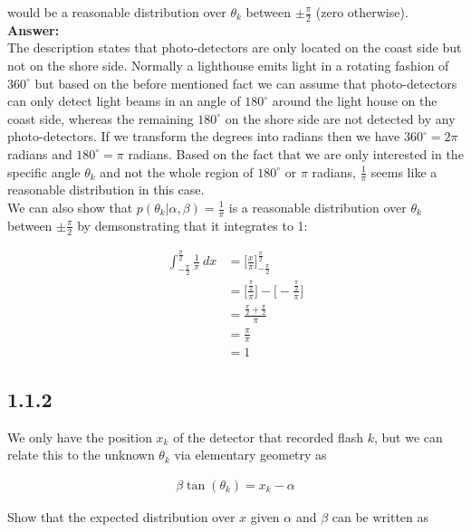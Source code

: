 \documentclass[a4paper]{article}
\begin{document}
would be a reasonable distribution over $\theta_k$ between $\pm \frac{\pi}{2}$ (zero otherwise).\\


\textbf{Answer:}\\

The description states that photo-detectors are only located on the coast side but not on the shore side. Normally a lighthouse emits light in a rotating fashion of $360^{\circ}$ but based on the before mentioned fact we can assume that photo-detectors can only detect light beams in an angle of $180^{\circ}$ around the light house on the coast side, whereas the remaining $180^{\circ}$ on the shore side are not detected by any photo-detectors. If we transform the degrees into radians then we have $360^{\circ} = 2 \pi $ radians and $180^{\circ} =  \pi $ radians. Based on the fact that we are only interested in the specific angle $\theta_k$ and not the whole region of $180^{\circ}$ or $\pi$ radians, $\frac{1}{\pi}$ seems like a reasonable distribution in this case.\\

We can also show that $p(\theta_k | \alpha, \beta) = \frac{1}{\pi}$ is a reasonable distribution over $\theta_k$ between $\pm \frac{\pi}{2}$ by demsonstrating that it integrates to 1:

\begin{align*}
\int_{-\frac{\pi}{2}}^{\frac{\pi}{2}} \frac{1}{\pi}  \: dx &= \bigg[ \frac{x}{\pi} \bigg]_{-\frac{\pi}{2}}^{\frac{\pi}{2}}\\
&= \big[ \frac{\frac{\pi}{2}}{\pi} \big] - \big[- \frac{\frac{\pi}{2}}{\pi} \big]\\
&= \frac{\frac{\pi}{2} + \frac{\pi}{2}}{\pi}\\
&= \frac{\pi}{\pi}\\
&= 1
\end{align*}

\subsection*{1.1.2}

We only have the position $x_k$ of the detector that recorded flash $k$, but we can relate this to the unknown $\theta_k$ via elementary geometry as

\begin{eqnarray}
\beta \tan(\theta_k) = x_k - \alpha	
\end{eqnarray}

Show that the expected distribution over $x$ given $\alpha$ and $\beta$ can be written as
\end{document}
